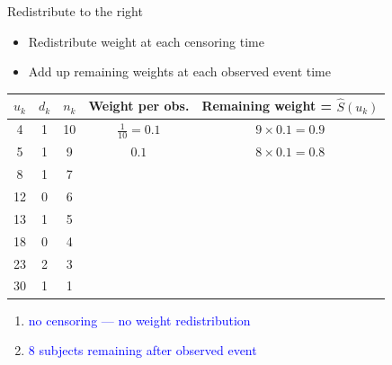 \documentclass[10pt,t]{beamer}
\begin{document}
\begin{frame}{Redistribute to the right}
	\begin{itemize}
		\item Redistribute weight at each censoring time
		\item Add up remaining weights at each observed event time
	\end{itemize}
	\begin{footnotesize}
		\begin{tabular}{|c|c|c|c|c|}
			\hline
			$u_k$ & $d_k$ & $n_k$ & Weight per obs. & Remaining weight = $\widehat{S}(u_k)$ \\
			\hline
			4 & 1 & 10 & $\frac{1}{10} = 0.1$ & $9\times 0.1= 0.9$\\
			5 & 1 & 9 & $0.1$ &  $8\times 0.1= 0.8$  \\
			8 & 1 & 7 & & \\
			12 & 0 & 6 & & \\
			13 & 1 & 5 & & \\
			18 & 0 & 4 & & \\
			23 & 2 & 3 & & \\
			30 & 1 & 1 & & \\
			\hline
		\end{tabular}
	\end{footnotesize}
	\begin{enumerate}
		\item \textcolor{blue}{no censoring --- no weight redistribution}
		\item \textcolor{blue}{8 subjects remaining after observed event}
	\end{enumerate}
\end{frame}
\end{document}
